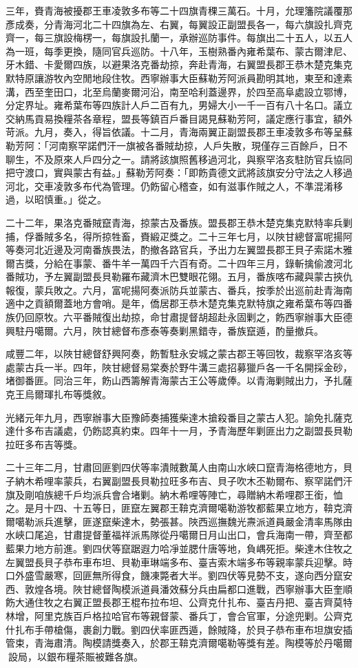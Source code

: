 \begin{pinyinscope}
三年，賚青海被擾郡王車凌敦多布等二十四旗青稞三萬石。十月，允理籓院議覆那彥成奏，分青海河北二十四旗為左、右翼，每翼設正副盟長各一，每六旗設扎齊克齊一，每三旗設梅楞一，每旗設扎蘭一，承辦巡防事件。每旗出二十五人，以五人為一班，每季更換，隨同官兵巡防。十八年，玉樹熟番內雍希葉布、蒙古爾津尼、牙木錯、卡愛爾四族，以避果洛克番劫掠，奔赴青海，右翼盟長郡王恭木楚克集克默特原讓游牧內空閒地段住牧。西寧辦事大臣蘇勒芳阿派員勘明其地，東至和達素溝，西至奎田口，北至烏蘭麥爾河沿，南至哈利蓋邊界，於四至高阜處設立鄂博，分定界址。雍希葉布等四族計人戶二百有九，男婦大小一千一百有八十名口。議立交納馬貢易換糧茶各章程，盟長等鎮百戶番目謁見蘇勒芳阿，議定應行事宜，額外苛派。九月，奏入，得旨依議。十二月，青海兩翼正副盟長郡王車凌敦多布等呈蘇勒芳阿：「河南察罕諾們汗一旗被各番賊劫掠，人戶失散，現僅存三百餘戶，日不聊生，不及原來人戶四分之一。請將該旗照舊移過河北，與察罕洛亥駐防官兵協同把守渡口，實與蒙古有益。」蘇勒芳阿奏：「即飭貴德文武將該旗安分守法之人移過河北，交車凌敦多布代為管理。仍飭留心稽查，如有滋事作賊之人，不準混淆移過，以昭慎重。」從之。

二十二年，果洛克番賊竄青海，掠蒙古及番族。盟長郡王恭木楚克集克默特率兵剿捕，俘番賊多名，得所掠牲畜，賚緞疋獎之。二十三年七月，以陜甘總督富呢揚阿等奏河北近邊及河南番族畏法，酌撤各路官兵，予出力左翼盟長郡王貝子索諾木雅爾吉獎，分給在事蒙、番牛羊一萬四千六百有奇。二十四年三月，錄斬擒偷渡河北番賊功，予左翼副盟長貝勒羅布藏濟木巴雙眼花翎。五月，番族喀布藏與蒙古挾仇報復，蒙兵敗之。六月，富呢揚阿奏派防兵並蒙古、番兵，按季於出巡前赴青海南適中之貢額爾蓋地方會哨。是年，僑居郡王恭木楚克集克默特旗之雍希葉布等四番族仍回原牧。六平番賊復出劫掠，命甘肅提督胡超赴永固剿之，飭西寧辦事大臣德興駐丹噶爾。六月，陜甘總督布彥泰等奏剿黑錯寺，番族竄遁，酌量撤兵。

咸豐二年，以陜甘總督舒興阿奏，飭暫駐永安城之蒙古郡王等回牧，裁察罕洛亥等處蒙古兵一半。四年，陜甘總督易棠奏於野牛溝三處招募獵戶各一千名開採金砂，堵御番匪。同治三年，飭山西籌解青海蒙古王公等歲俸。以青海剿賊出力，予扎薩克王烏爾琿扎布等獎敘。

光緒元年九月，西寧辦事大臣豫師奏捕獲柴達木搶殺番目之蒙古人犯。諭免扎薩克達什多布吉議處，仍飭認真約束。四年十一月，予青海歷年剿匪出力之副盟長貝勒拉旺多布吉等獎。

二十三年二月，甘肅回匪劉四伏等率潰賊數萬人由南山水峽口竄青海格德地方，貝子納木希哩率蒙兵，右翼副盟長貝勒拉旺多布吉、貝子吹木丕勒爾布、察罕諾們汗旗及剛咱族總千戶均派兵會合堵剿。納木希哩等陣亡，尋贈納木希哩郡王銜，恤之。是月十四、十五等日，匪竄左翼郡王鞥克濟爾噶勒游牧都藍果立地方，鞥克濟爾噶勒派兵進擊，匪遂竄柴達木，勢張甚。陜西巡撫魏光燾派道員嚴金清率馬隊由水峽口尾追，甘肅提督董福祥派馬隊從丹噶爾日月山出口，會兵海南一帶，齊至都藍果力地方前進。劉四伏等竄踞遐力哈凈並腮什唐等地，負嵎死拒。柴達木住牧之左翼盟長貝子恭布車布坦、貝勒車琳端多布、臺吉索木端多布等親率蒙兵迎擊。時口外盛雪嚴寒，回匪無所得食，饑凍斃者大半。劉四伏等見勢不支，遂向西分竄安西、敦煌各境。陜甘總督陶模派道員潘效蘇分兵由扁都口進戰，西寧辦事大臣奎順飭大通住牧之右翼正盟長郡王棍布拉布坦、公齊克什扎布、臺吉丹把、臺吉齊莫特林增，阿里克族百戶格拉哈官布等親督蒙、番兵丁，會合官軍，分途兜剿。公齊克什扎布手帶槍傷，裹創力戰。劉四伏率匪西遁，餘賊降，於貝子恭布車布坦旗安插管束，青海肅清。陶模請獎奏入，於郡王鞥克濟爾噶勒等獎有差。陶模等於丹噶爾設局，以銀布糧茶賑被難各旗。


\end{pinyinscope}
